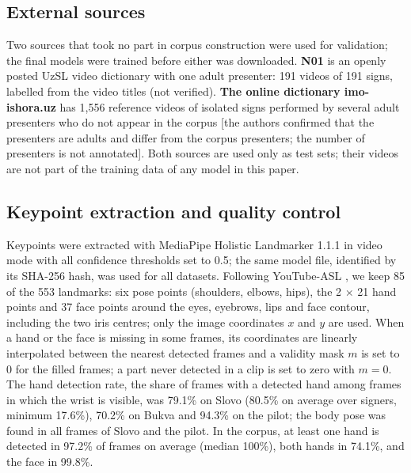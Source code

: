 \documentclass[a4paper,fleqn]{cas-dc}
\begin{document}
\hypertarget{external-sources}{%
\subsection{External sources}\label{external-sources}}

Two sources that took no part in corpus construction were used for validation; the final models were trained before either was downloaded. \textbf{N01} is an openly posted UzSL video dictionary with one adult presenter: 191 videos of 191 signs, labelled from the video titles (not verified). \textbf{The online dictionary imo-ishora.uz} has 1,556 reference videos of isolated signs performed by several adult presenters who do not appear in the corpus {\color{red}[the authors confirmed that the presenters are adults and differ from the corpus presenters; the number of presenters is not annotated]}. Both sources are used only as test sets; their videos are not part of the training data of any model in this paper.

\hypertarget{keypoint-extraction-and-quality-control}{%
\subsection{Keypoint extraction and quality control}\label{keypoint-extraction-and-quality-control}}

Keypoints were extracted with MediaPipe Holistic Landmarker 1.1.1 \cite{docs_mediapipe_holistic_landmarker} in video mode with all confidence thresholds set to 0.5; the same model file, identified by its SHA-256 hash, was used for all datasets. Following YouTube-ASL \cite{2023_uthus_youtube_asl}, we keep 85 of the 553 landmarks: six pose points (shoulders, elbows, hips), the 2 $\times$ 21 hand points and 37 face points around the eyes, eyebrows, lips and face contour, including the two iris centres; only the image coordinates \(x\) and \(y\) are used. When a hand or the face is missing in some frames, its coordinates are linearly interpolated between the nearest detected frames and a validity mask \(m\) is set to 0 for the filled frames; a part never detected in a clip is set to zero with \(m = 0\). The hand detection rate, the share of frames with a detected hand among frames in which the wrist is visible, was 79.1\% on Slovo (80.5\% on average over signers, minimum 17.6\%), 70.2\% on Bukva and 94.3\% on the pilot; the body pose was found in all frames of Slovo and the pilot. In the corpus, at least one hand is detected in 97.2\% of frames on average (median 100\%), both hands in 74.1\%, and the face in 99.8\%.
\end{document}
